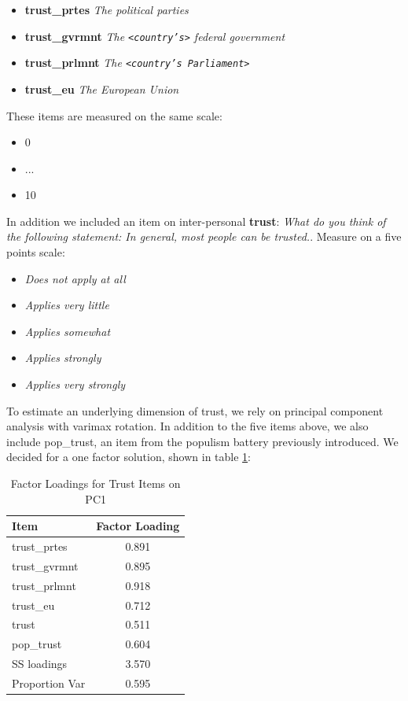 \documentclass[12pt]{article}
\begin{document}
\begin{itemize}
  \item \textbf{trust\_prtes} \textit{The political parties}
  \item \textbf{trust\_gvrmnt} \textit{The \texttt{<country's>} federal government}
  \item \textbf{trust\_prlmnt} \textit{The \texttt{<country's Parliament>}}
  \item \textbf{trust\_eu} \textit{The European Union}
\end{itemize}

These items are measured on the same scale:

\begin{itemize}
  \item 0
  \item ...
  \item 10
\end{itemize}

In addition we included an item on inter-personal \textbf{trust}: \textit{What do you think of the following statement: In general, most people can be trusted.}. Measure on a five points scale:
\begin{itemize}
\item \textit{Does not apply at all}
\item \textit{Applies very little}
\item \textit{Applies somewhat}
\item \textit{Applies strongly}
\item \textit{Applies very strongly}
\end{itemize}

To estimate an underlying dimension of trust, we rely on principal component analysis with varimax rotation. In addition to the five items above, we also include pop\_trust, an item from the populism battery previously introduced. We decided for a one factor solution, shown in table \ref{trust_factor_loadings}:


\begin{table}[ht]
\centering
\caption{Factor Loadings for Trust Items on PC1}
\label{trust_factor_loadings}
\begin{tabular}{lc}
\hline
\textbf{Item}       & \textbf{Factor Loading} \\
\hline
trust\_prtes & 0.891 \\
trust\_gvrmnt& 0.895 \\
trust\_prlmnt& 0.918 \\
trust\_eu    & 0.712 \\
trust        & 0.511 \\
pop\_trust   & 0.604 \\
\hline
SS loadings     & 3.570 \\
Proportion Var  & 0.595 \\
\hline
\end{tabular}
\end{table}
\end{document}
